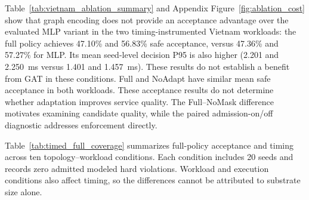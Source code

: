 \documentclass[final,5p]{elsarticle}
\newcommand{\rev}[1]{\textcolor{revisiongreen}{#1}}
\let\newrev\rev
\begin{document}
\newrev{Table~\ref{tab:vietnam_ablation_summary} and Appendix Figure~\ref{fig:ablation_cost} show that graph encoding does not provide an acceptance advantage over the evaluated MLP variant in the two timing-instrumented Vietnam workloads: the full policy achieves 47.10\% and 56.83\% safe acceptance, versus 47.36\% and 57.27\% for MLP. Its mean seed-level decision P95 is also higher (2.201 and 2.250~ms versus 1.401 and 1.457~ms). These results do not establish a benefit from GAT in these conditions. Full and NoAdapt have similar mean safe acceptance in both workloads. These acceptance results do not determine whether adaptation improves service quality. The Full--NoMask difference motivates examining candidate quality, while the paired admission-on/off diagnostic addresses enforcement directly.}



\newrev{Table~\ref{tab:timed_full_coverage} summarizes full-policy acceptance and timing across ten topology--workload conditions. Each condition includes 20 seeds and records zero admitted modeled hard violations. Workload and execution conditions also affect timing, so the differences cannot be attributed to substrate size alone.}
\begin{table}[t]
\centering
\caption{\newrev{Full-policy safe acceptance and decision timing (20 seeds; mean $\pm$ sample SD). Timing summarizes seed-level P95 values; it is not a pooled request-level P95.}}
\label{tab:timed_full_coverage}
{\color{revisiongreen}\scriptsize
\setlength{\tabcolsep}{3pt}
}
\end{table}
\end{document}
